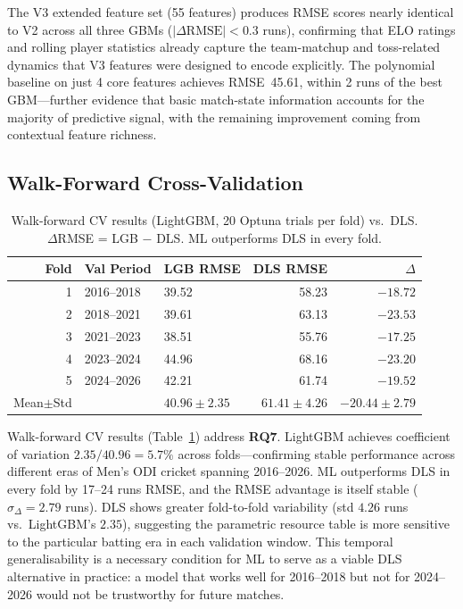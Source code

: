 \documentclass[10pt,a4paper,twocolumn]{article}
\begin{document}
The V3 extended feature set (55 features) produces RMSE scores nearly identical to V2 across all three GBMs ($|\Delta\text{RMSE}| < 0.3$ runs), confirming that ELO ratings and rolling player statistics already capture the team-matchup and toss-related dynamics that V3 features were designed to encode explicitly. The polynomial baseline on just 4 core features achieves RMSE~45.61, within 2 runs of the best GBM---further evidence that basic match-state information accounts for the majority of predictive signal, with the remaining improvement coming from contextual feature richness.

\subsection{Walk-Forward Cross-Validation}

\begin{table}[htbp]
\centering
\caption{Walk-forward CV results (LightGBM, 20 Optuna trials per fold) vs.\ DLS. $\Delta$RMSE = LGB $-$ DLS. ML outperforms DLS in every fold.}
\label{tab:wfcv}
\small
\begin{tabular}{rllrr}
\toprule
\textbf{Fold} & \textbf{Val Period} & \textbf{LGB RMSE} & \textbf{DLS RMSE} & $\Delta$ \\
\midrule
1 & 2016--2018 & 39.52 & 58.23 & $-18.72$ \\
2 & 2018--2021 & 39.61 & 63.13 & $-23.53$ \\
3 & 2021--2023 & 38.51 & 55.76 & $-17.25$ \\
4 & 2023--2024 & 44.96 & 68.16 & $-23.20$ \\
5 & 2024--2026 & 42.21 & 61.74 & $-19.52$ \\
\midrule
Mean$\pm$Std & & $40.96\pm2.35$ & $61.41\pm4.26$ & $-20.44\pm2.79$ \\
\bottomrule
\end{tabular}
\end{table}

Walk-forward CV results (Table~\ref{tab:wfcv}) address \textbf{RQ7}. LightGBM achieves coefficient of variation $2.35/40.96 = 5.7\%$ across folds---confirming stable performance across different eras of Men's ODI cricket spanning 2016--2026. ML outperforms DLS in every fold by 17--24 runs RMSE, and the RMSE advantage is itself stable ($\sigma_\Delta = 2.79$ runs). DLS shows greater fold-to-fold variability (std $4.26$ runs vs.\ LightGBM's $2.35$), suggesting the parametric resource table is more sensitive to the particular batting era in each validation window. This temporal generalisability is a necessary condition for ML to serve as a viable DLS alternative in practice: a model that works well for 2016--2018 but not for 2024--2026 would not be trustworthy for future matches.
\end{document}
